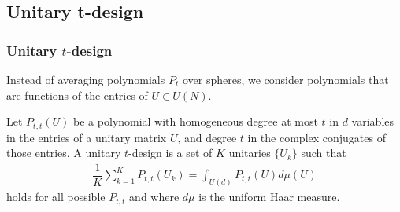 \documentclass{beamer}
\begin{document}
\subsection{Unitary t-design}
\begin{frame}
  \frametitle{Unitary $t$-design}
  Instead of averaging polynomials $P_t$ over spheres, we consider polynomials that are functions of the entries of $U\in U(N)$.
  \begin{definition}
    Let $P_{t,t}(U)$ be a polynomial with homogeneous degree at most $t$ in $d$ variables in the entries of a unitary matrix $U$, and degree $t$ in the complex conjugates of those entries. A unitary $t$-design is a set of $K$ unitaries $\{U_k\}$ such that 
    \begin{align} 
      \dfrac{1}{K}\sum_{k=1}^K P_{t,t}(U_k) = \int_{U(d)} P_{t,t}(U)d\mu(U) 
    \end{align}
    holds for all possible $P_{t,t}$ and where $d\mu$ is the uniform Haar measure. 
  \end{definition}
\end{frame}
\end{document}
